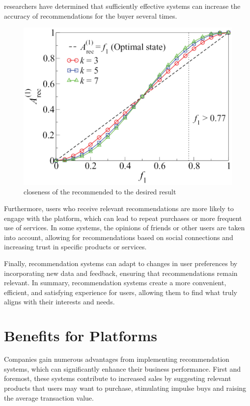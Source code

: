 \documentclass[10pt,twoside,slovak,a4paper]{article}
\begin{document}
researchers have determined that
sufficiently effective systems can increase the accuracy of recommendations for the buyer several times.
\begin{figure}[!h]
    \centering
    \includegraphics[width=0.85\linewidth]{picture.jpg}
    \caption{closeness of the recommended to the desired result}
    \label{fig:closeness}
\end{figure}

Furthermore, users who receive relevant recommendations are more likely to engage with the platform, which can lead to repeat purchases or more frequent use of services. In some systems, the opinions of friends or other users are taken into account, allowing for recommendations based on social connections and increasing trust in specific products or services.

Finally, recommendation systems can adapt to changes in user preferences by incorporating new data and feedback, ensuring that recommendations remain relevant. In summary, recommendation systems create a more convenient, efficient, and satisfying experience for users, allowing them to find what truly aligns with their interests and needs.




\section{Benefits for Platforms} \label{Benefits for Platforms}
Companies gain numerous advantages from implementing recommendation systems\cite{comerce}, which can significantly enhance their business performance. First and foremost, these systems contribute to increased sales by suggesting relevant products that users may want to purchase, stimulating impulse buys and raising the average transaction value.
\end{document}
